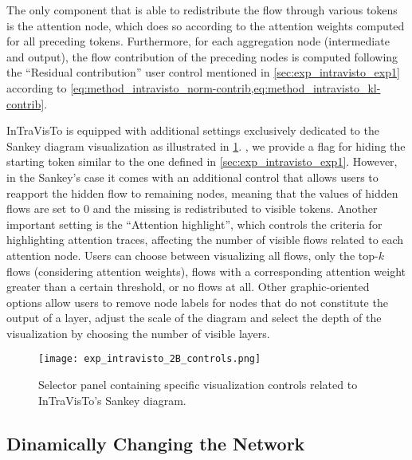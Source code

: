 The only component that is able to redistribute the flow through various tokens is the attention node, which does so according to the attention weights computed for all preceding tokens.
Furthermore, for each aggregation node (intermediate and output), the flow contribution of the preceding nodes is computed following the ``Residual contribution'' user control mentioned in \cref{sec:exp_intravisto_exp1} according to \cref{eq:method_intravisto_norm-contrib,eq:method_intravisto_kl-contrib}.

InTraVisTo is equipped with additional settings exclusively dedicated to the Sankey diagram visualization as illustrated in \cref{fig:exp_intravisto_2_B}.
, we provide a flag for hiding the starting token similar to the one defined in \cref{sec:exp_intravisto_exp1}.
However, in the Sankey's case it comes with an additional control that allows users to reapport the hidden flow to remaining nodes, meaning that the values of hidden flows are set to $0$ and the missing  is redistributed to visible tokens.
Another important setting is the ``Attention highlight'', which controls the criteria for highlighting attention traces, affecting the number of visible flows related to each attention node.
Users can choose between visualizing all flows, only the top-$k$ flows (considering attention weights),  flows with a corresponding attention weight greater than a certain threshold, or no flows at all.
Other graphic-oriented options allow users to remove node labels for nodes that do not constitute the output of a layer, adjust the scale of the diagram and select the depth of the visualization by choosing the number of visible layers.

\begin{figure}[t!]
    \centering
    \texttt{[image: exp\_intravisto\_2B\_controls.png]}
    \caption{Selector panel containing specific visualization controls related to InTraVisTo's Sankey diagram.}
    \label{fig:exp_intravisto_2_B}
\end{figure}

\subsection{Dinamically Changing the Network}\label{sec:exp_intravisto_exp3}

